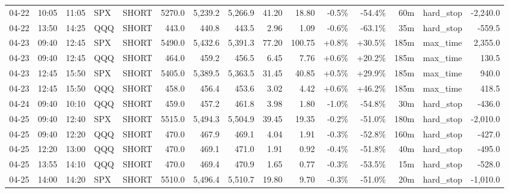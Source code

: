 \documentclass[11pt,a4paper,twoside]{article}
\begin{document}
\begin{landscape}
\begin{center}
\begin{longtable}{>{\color{txtmain}}l l l l l r r r r r r r r >{\color{txtmain}}l r}
04-22 & 10:05 & 11:05 & SPX & SHORT & 5270.0 & 5,239.2 & 5,266.9 & 41.20 & 18.80 & \textcolor{lossred}{-0.5\%} & \textcolor{lossred}{-54.4\%} & 60m & hard\_stop & \textcolor{lossred}{-2,240.0} \\
04-22 & 13:50 & 14:25 & QQQ & SHORT & 443.0 & 440.8 & 443.5 & 2.96 & 1.09 & \textcolor{lossred}{-0.6\%} & \textcolor{lossred}{-63.1\%} & 35m & hard\_stop & \textcolor{lossred}{-559.5} \\
04-23 & 09:40 & 12:45 & SPX & SHORT & 5490.0 & 5,432.6 & 5,391.3 & 77.20 & 100.75 & \textcolor{wingreen}{+0.8\%} & \textcolor{wingreen}{+30.5\%} & 185m & max\_time & \textcolor{wingreen}{2,355.0} \\
04-23 & 09:40 & 12:45 & QQQ & SHORT & 464.0 & 459.2 & 456.5 & 6.45 & 7.76 & \textcolor{wingreen}{+0.6\%} & \textcolor{wingreen}{+20.2\%} & 185m & max\_time & \textcolor{wingreen}{130.5} \\
04-23 & 12:45 & 15:50 & SPX & SHORT & 5405.0 & 5,389.5 & 5,363.5 & 31.45 & 40.85 & \textcolor{wingreen}{+0.5\%} & \textcolor{wingreen}{+29.9\%} & 185m & max\_time & \textcolor{wingreen}{940.0} \\
04-23 & 12:45 & 15:50 & QQQ & SHORT & 458.0 & 456.4 & 453.6 & 3.02 & 4.42 & \textcolor{wingreen}{+0.6\%} & \textcolor{wingreen}{+46.2\%} & 185m & max\_time & \textcolor{wingreen}{418.5} \\
04-24 & 09:40 & 10:10 & QQQ & SHORT & 459.0 & 457.2 & 461.8 & 3.98 & 1.80 & \textcolor{lossred}{-1.0\%} & \textcolor{lossred}{-54.8\%} & 30m & hard\_stop & \textcolor{lossred}{-436.0} \\
04-25 & 09:40 & 12:40 & SPX & SHORT & 5515.0 & 5,494.3 & 5,504.9 & 39.45 & 19.35 & \textcolor{lossred}{-0.2\%} & \textcolor{lossred}{-51.0\%} & 180m & hard\_stop & \textcolor{lossred}{-2,010.0} \\
04-25 & 09:40 & 12:20 & QQQ & SHORT & 470.0 & 467.9 & 469.1 & 4.04 & 1.91 & \textcolor{lossred}{-0.3\%} & \textcolor{lossred}{-52.8\%} & 160m & hard\_stop & \textcolor{lossred}{-427.0} \\
04-25 & 12:20 & 13:00 & QQQ & SHORT & 470.0 & 469.1 & 471.0 & 1.91 & 0.92 & \textcolor{lossred}{-0.4\%} & \textcolor{lossred}{-51.8\%} & 40m & hard\_stop & \textcolor{lossred}{-495.0} \\
04-25 & 13:55 & 14:10 & QQQ & SHORT & 470.0 & 469.4 & 470.9 & 1.65 & 0.77 & \textcolor{lossred}{-0.3\%} & \textcolor{lossred}{-53.5\%} & 15m & hard\_stop & \textcolor{lossred}{-528.0} \\
04-25 & 14:00 & 14:20 & SPX & SHORT & 5510.0 & 5,496.4 & 5,510.7 & 19.80 & 9.70 & \textcolor{lossred}{-0.3\%} & \textcolor{lossred}{-51.0\%} & 20m & hard\_stop & \textcolor{lossred}{-1,010.0} \\

\end{longtable}
\end{center}
\end{landscape}
\end{document}
